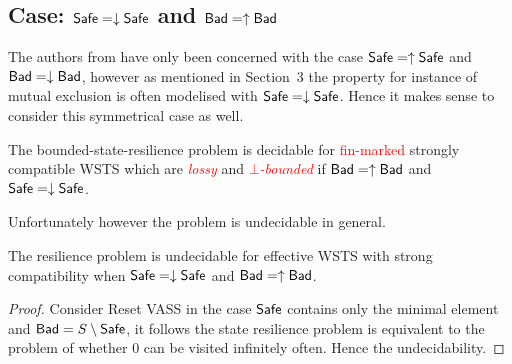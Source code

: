 \iffalse
\begin{proposition}
\textcolor{red}{
{\sc bounded resilience} is undecidable for WSTS with upward compatibility with an effective basis of $post^*$.
CONJECTURE
}
\end{proposition}

\begin{proof}
 \textcolor{red}{pas certain ! à faire Mathieu}
\end{proof}
\fi


\subsection{Case: $\textsf{Safe} = \downarrow \textsf{Safe}$ and $\textsf{Bad} = \uparrow \textsf{Bad}$}


The authors from \cite{DBLP:conf/gg/Ozkan22,DBLP:journals/corr/abs-2108-00889}
have only been concerned with the case $\textsf{Safe} = \uparrow \textsf{Safe}$
and $\textsf{Bad} =\downarrow \textsf{Bad}$, 
 however as mentioned in Section~3
the property for instance of mutual exclusion is often modelised with $\textsf{Safe} = \downarrow \textsf{Safe}$.
Hence it makes sense to consider this symmetrical case as well. \\



\begin{theorem}{\cite{DBLP:conf/gg/Ozkan22}}
The bounded-state-resilience problem is decidable for \textcolor{red}{fin-marked} 
strongly compatible WSTS
 which are 
 {\em \textcolor{red}{lossy} } 
 and 
 {\em \textcolor{red}{$\bot$-bounded}  }
 if $\textsf{Bad} = \uparrow \textsf{Bad}$ and $\textsf{Safe} = \downarrow \textsf{Safe}$.
\end{theorem}



Unfortunately however the problem is undecidable in general.

\begin{theorem}
The resilience problem is undecidable for effective WSTS with  strong  compatibility 
when
$\textsf{Safe}=\downarrow \textsf{Safe}$
and $\textsf{Bad}=\uparrow \textsf{Bad}$.
\end{theorem}

\begin{proof}
Consider Reset VASS
in the case $\textsf{Safe}$ contains only the minimal element %
and $\textsf{Bad} = S \setminus \textsf{Safe}$, 
it follows the state resilience problem is equivalent 
to the problem of whether $0$ can be visited infinitely often. 
%
Hence the undecidability.
\end{proof}


